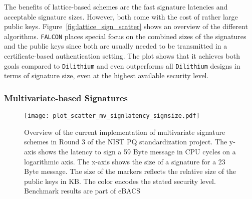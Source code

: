 The benefits of lattice-based schemes are the fast signature latencies and acceptable signature sizes. However, both come with the cost of rather large public keys. Figure~\ref{fig:lattice_sign_scatter} shows an overview of the different algorithms. \texttt{FALCON} places special focus on the combined sizes of the signatures and the public keys since both are usually needed to be transmitted in a certificate-based authentication setting. The plot shows that it achieves both goals compared to \texttt{Dilithium} and even outperforms all \texttt{Dilithium} designs in terms of signature size, even at the highest available security level.


\subsubsection{Multivariate-based Signatures}
\begin{figure}[ht]
    \centering\texttt{[image: plot\_scatter\_mv\_signlatency\_signsize.pdf]}
    \caption{Overview of the current implementation of multivariate signature schemes in Round 3 of the \acs{NIST} \acs{PQ} standardization project. The y-axis shows the latency to sign a 59 Byte message in \acs{CPU} cycles on a logarithmic axis. The x-axis shows the size of a signature for a 23 Byte message. The size of the markers reflects the relative size of the public keys in KB. The color encodes the stated security level. Benchmark results are part of eBACS\cite{eBACS}}\label{fig:multivariate_sign_scatter}
\end{figure}


